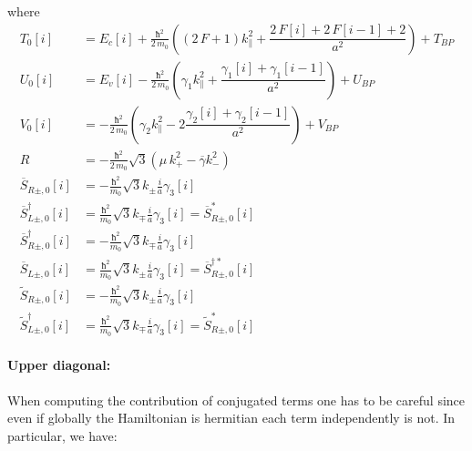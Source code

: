 \documentclass[prb,aps]{revtex4}
\begin{document}
    where
	\begin{align}
		 T_0[i] &= E_c[i] + \frac{ħ^2}{2\,m_0} \left( (2\,F + 1) k_\parallel^2 + \dfrac{2\,F[i] + 2\,F[i-1] + 2}{a^2} \right) + T_{BP} \\
		 U_0[i] &= E_v[i] - \frac{ħ^2 }{2\,m_0} \left( γ_1 k_\parallel^2 + \dfrac{γ_1[i] + γ_1[i-1]}{a^2} \right) + U_{BP}\\
		 V_0[i] &=  - \frac{ħ^2}{2\,m_0} \left( γ_2 k_\parallel^2 - 2 \dfrac{γ_2[i] + γ_2[i-1]}{a^2} \right) + V_{BP}\\
		R &= - \frac{ħ^2}{2\,m_0} \sqrt{3} \left( μ\,k_+^2 - \overline{γ} k_-^2 \right)\\
		 \overline{S}_{R\pm,0}[i] &= -\frac{ħ^2}{m_0} \sqrt{3} k_\pm \frac{i}{a} γ_3[i]\\
		 \overline{S}_{L\pm,0}^\dagger[i] &= \frac{ħ^2}{m_0} \sqrt{3} k_\mp \frac{i}{a} γ_3[i] = \overline{S}_{R\pm,0}^*[i]\\
		 \overline{S}_{R\pm,0}^\dagger[i] &= -\frac{ħ^2}{m_0} \sqrt{3} k_\mp \frac{i}{a} γ_3[i]\\
		 \overline{S}_{L\pm,0}[i] &= \frac{ħ^2}{m_0} \sqrt{3} k_\pm \frac{i}{a} γ_3[i] = \overline{S}_{R\pm,0}^{\dagger*}[i]\\
		 \tilde{S}_{R\pm,0} [i] &= -\frac{ħ^2}{m_0} \sqrt{3} k_\pm \frac{i}{a} γ_3[i]\\
		 \tilde{S}_{L\pm,0}^\dagger [i] &= \frac{ħ^2}{m_0} \sqrt{3} k_\mp \frac{i}{a} γ_3[i]=\tilde{S}_{R\pm,0}^* [i]
	\end{align}


	\paragraph{Upper diagonal:\\}
	When computing the contribution of conjugated terms one has to be careful since even if globally the Hamiltonian is hermitian each term independently is not. In particular, we have:
\end{document}
